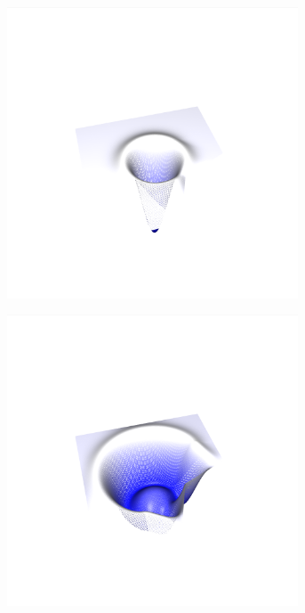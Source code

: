 \documentclass[crop=false,10pt,ngerman]{standalone}
\begin{document}
\begin{figure}[h]
\begin{subfigure}[b]{0.24\textwidth}
          \caption{}
        \end{subfigure}
        \begin{subfigure}[b]{0.24\textwidth}
          \center
          \includegraphics[trim={4cm 1.2cm 4.5cm 1.5cm},clip,width=0.95\textwidth]{images/test_wave_2.png}
          \caption{}
        \end{subfigure}
        \begin{subfigure}[b]{0.24\textwidth}
          \center
          \includegraphics[trim={4cm 1.2cm 4.5cm 1.5cm},clip,width=0.95\textwidth]{images/test_wave_3.png}
          \caption{}
        \end{subfigure}


\end{figure}
\end{document}
